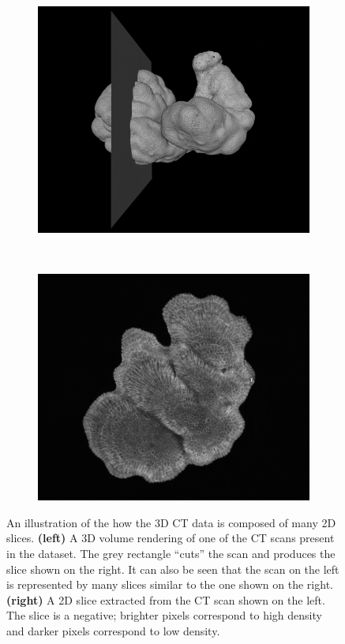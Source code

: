 \begin{figure}[!t]
    \centering
    \begin{subfigure}[t]{0.49\textwidth}
        \centering
        \includegraphics[width=1\textwidth, valign=c]{images/extraction.png}
    \end{subfigure}
    ~
    \begin{subfigure}[t]{0.49\textwidth}
        \centering
        \includegraphics[width=1\textwidth, valign=c]{images/slice-example.png}
    \end{subfigure}
    \caption{An illustration of the how the 3D CT data is composed of many 2D slices. \textbf{(left)} A 3D volume rendering of one of the CT scans present in the dataset. The grey rectangle ``cuts'' the scan and produces the slice shown on the right. It can also be seen that the scan on the left is represented by many slices similar to the one shown on the right. \textbf{(right)} A 2D slice extracted from the CT scan shown on the left. The slice is a negative; brighter pixels correspond to high density and darker pixels correspond to low density.}
    \label{fig:extraction}
\end{figure}

